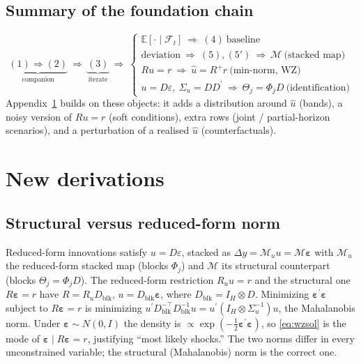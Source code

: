 \documentclass[11pt]{article}
\newcommand{\E}{\mathbb{E}}
\newcommand{\Fset}{\mathcal{F}}
\newcommand{\tp}{^{\prime}}
\newcommand{\eps}{\varepsilon}
\newcommand{\beps}{\bm{\varepsilon}}
\newcommand{\Mmap}{\mathcal{M}}
\newcommand{\pinv}[1]{#1^{+}}
\theoremstyle{remark}
\begin{document}
\subsection*{Summary of the foundation chain}
\[
\underbrace{(1)\Rightarrow(2)}_{\text{companion}}
\ \Rightarrow\
\underbrace{(3)}_{\text{iterate}}
\ \Rightarrow\
\begin{cases}
\E[\cdot\mid\Fset_t]\ \Rightarrow\ (4)\ \text{baseline}\\[2pt]
\text{deviation}\ \Rightarrow\ (5),(5')\ \Rightarrow\ \Mmap\ \text{(stacked map)}\\[2pt]
Ru=r\ \Rightarrow\ \hat u=\pinv{R}r\ \text{(min-norm, WZ)}\\[2pt]
u=D\eps,\ \Sigma_u=DD\tp\ \Rightarrow\ \Theta_j=\Phi_jD\ \text{(identification)}
\end{cases}
\]
Appendix~\ref{app:new} builds on these objects: it adds a distribution around
$\hat u$ (bands), a noisy version of $Ru=r$ (soft conditions), extra rows (joint /
partial-horizon scenarios), and a perturbation of a realised $\hat u$
(counterfactuals).

\section{New derivations}\label{app:new}

\subsection{Structural versus reduced-form norm}\label{app:norm}
Reduced-form innovations satisfy $u=D\eps$, stacked as
$\Delta y=\Mmap_u u=\Mmap\beps$ with $\Mmap_u$ the reduced-form stacked map (blocks
$\Phi_j$) and $\Mmap$ its structural counterpart (blocks $\Theta_j=\Phi_jD$). The
reduced-form restriction $R_u u=r$ and the structural one $R\beps=r$ have
$R=R_uD_{\text{blk}}$, $u=D_{\text{blk}}\beps$, where $D_{\text{blk}}=I_H\otimes D$.
Minimizing $\beps\tp\beps$ subject to $R\beps=r$ is minimizing
$u\tp D_{\text{blk}}^{-\top}D_{\text{blk}}^{-1}u=u\tp(I_H\otimes\Sigma_u^{-1})u$,
the Mahalanobis norm. Under $\beps\sim N(0,I)$ the density is
$\propto\exp(-\tfrac12\beps\tp\beps)$, so \eqref{eq:wzsol} is the mode of
$\beps\mid R\beps=r$, justifying ``most likely shocks.'' The two norms differ in
every unconstrained variable; the structural (Mahalanobis) norm is the correct one.
\end{document}

